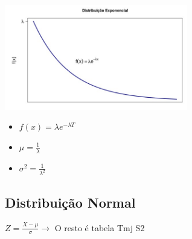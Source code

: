 \documentclass{article}
\begin{document}
  \begin{multicols}{2}

    \hbox{\includegraphics[width=8cm]{Distribuição exponelcial.jpg}}

    \begin{itemize}
      \item $ f(x) = \lambda e^{-\lambda T}$
      \item $ \mu = \frac{1}{\lambda} $
      \item $ \sigma^2 = \frac{1}{\lambda^2}$
    \end{itemize}

  \end{multicols}

  \subsection{Distribuição Normal}
  \begin{center}
    $ Z = \frac{X - \mu}{\sigma} \rightarrow $ O resto é tabela Tmj S2
  \end{center}
\end{document}
